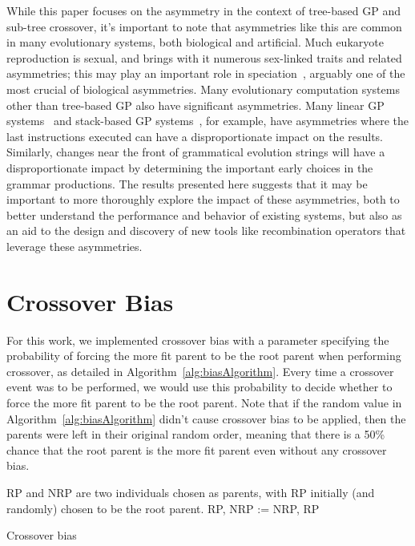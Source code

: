 \documentclass{sig-alternate}
\begin{document}
While this paper focuses on the asymmetry in the context of tree-based GP and sub-tree crossover, it's important to 
note that asymmetries like this are common in many evolutionary systems, both biological and artificial. Much 
eukaryote reproduction is sexual, and brings with it numerous sex-linked traits and related asymmetries; this may
play an important role in speciation~\cite{qvarnstrom2009speciation}, arguably one of the most crucial of 
biological asymmetries.
Many evolutionary computation systems other than tree-based GP also have 
significant asymmetries. Many linear GP systems~\cite{brameier2007linear} and stack-based GP 
systems~\cite{spector:2002:GPEM}, for example, have asymmetries where the last instructions executed can have a 
disproportionate impact on the results. Similarly, changes near the front of grammatical evolution 
\cite{o2003grammatical} strings will have a 
disproportionate impact by determining the important early choices in the grammar productions. 
The results presented here suggests that it may be important to more thoroughly explore the impact of these asymmetries, both to better understand the performance and behavior of existing systems, but also as an aid to the design and discovery of new tools like recombination operators that leverage these asymmetries.

\section{Crossover Bias} \label{sec:XObias}

For this work, we implemented crossover bias with a parameter specifying the probability of forcing 
the more fit parent to be the root parent when performing crossover, as detailed in 
Algorithm~\ref{alg:biasAlgorithm}. Every time a 
crossover event was to be performed, we would use this probability to decide whether to force the 
more fit parent to be the root parent. Note that if the random value in Algorithm~\ref{alg:biasAlgorithm} 
didn't cause crossover bias to be applied, then the parents were left in their original random order, 
meaning that there is a 50\% chance that the root 
parent is the more fit parent even without any crossover bias.

\begin{algorithm}[tb]
\begin{algorithmic}
\Require RP and NRP are two individuals chosen as parents, with RP initially (and randomly) chosen to be the root parent.
 
        \State RP, NRP := NRP, RP  
    \EndIf
\EndIf
\end{algorithmic}
\caption{Crossover bias}
\label{alg:biasAlgorithm}
\end{algorithm}
\end{document}
